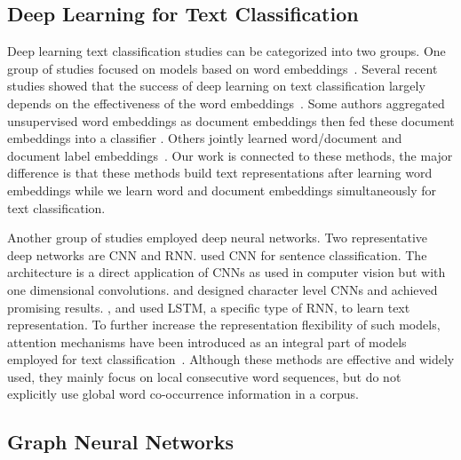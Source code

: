 \documentclass[letterpaper]{article} \usepackage{aaai19}  \usepackage{times}  \usepackage{helvet}  \usepackage{courier}  \usepackage{url}  \usepackage{graphicx}  \frenchspacing  \usepackage{amsmath}
\begin{document}
\subsection{Deep Learning for Text Classification}
Deep learning text classification studies can be categorized into two groups.
One group of studies focused on models based on word embeddings~\cite{mikolov2013distributed,pennington2014glove}. Several recent studies showed that the success of deep learning on text classification largely depends on the effectiveness of the word embeddings~\cite{Shen2018Baseline,joulin2017bag,P18-1216}. Some authors aggregated unsupervised word embeddings as document embeddings then fed these document embeddings into a classifier \cite{le2014distributed,joulin2017bag}. Others jointly learned word/document and document label embeddings~\cite{tang2015pte,P18-1216}. Our work is connected to these methods, the major difference is that these methods build text representations after learning word embeddings while we learn word and document embeddings simultaneously for text classification.

Another group of studies employed deep neural networks. Two representative deep networks are CNN and RNN. \cite{kim2014convolutional} used CNN for sentence classification. The architecture is a direct application of CNNs as used in computer vision but with one dimensional convolutions. \cite{zhang2015character} and \cite{conneau2017very} designed character level CNNs and achieved promising results. \cite{tai2015improved}, \cite{liu2016recurrent} and \cite{luo2017recurrent} used LSTM, a specific type of RNN, to learn text representation. To further increase the representation flexibility of such models, attention mechanisms have been introduced as an integral part of models employed for text classification~\cite{yang2016hierarchical,wang2016attention}. 
Although these methods are effective and widely used, they mainly focus on local consecutive word sequences, but do not explicitly use global word co-occurrence information in a corpus.

\subsection{Graph Neural Networks}
\end{document}
